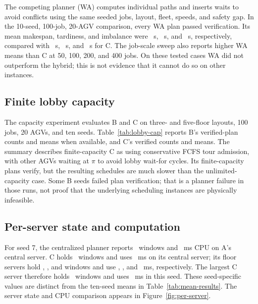 The competing planner (WA) computes individual paths and inserts waits to
avoid conflicts using the same seeded jobs, layout, fleet, speeds, and safety
gap. In the 10-seed, 100-job, 20-AGV comparison, every WA plan passed
verification. Its mean makespan, tardiness, and imbalance were \WAMakespan~s,
\WATardiness~s, and \WAImbalance~s, respectively, compared with \MakespanC~s,
\TardinessC~s, and \ImbalanceC~s for C. The job-scale sweep also reports higher WA
means than C at 50, 100, 200, and 400 jobs. On these tested cases WA did not
outperform the hybrid; this is not evidence that it cannot do so on other
instances.

\subsection{Finite lobby capacity}

The capacity experiment evaluates B and C on three- and five-floor layouts,
100 jobs, 20 AGVs, and ten seeds. Table~\ref{tab:lobby-cap} reports B's
verified-plan counts and means when available, and C's verified counts and
means. The summary describes finite-capacity C as using conservative FCFS
tour admission, with other AGVs waiting at $\pi$ to avoid lobby wait-for
cycles. Its finite-capacity plans verify, but the resulting schedules are
much slower than the unlimited-capacity case. Some B seeds failed plan
verification; that is a planner failure in those runs, not proof that the
underlying scheduling instances are physically infeasible.

\begin{table}[htbp]
\centering
\scriptsize
\caption{Finite-lobby results: verified runs out of ten and mean $\pm$ sd makespan / tardiness (s).}
\label{tab:lobby-cap}

\end{table}

\subsection{Per-server state and computation}

For seed 7, the centralized planner reports \SeedSevenWindowsCentralA~windows and
\SeedSevenCpuCentralA~ms CPU on A's central server. C holds
\SeedSevenWindowsCentralC~windows and uses \SeedSevenCpuCentralC~ms on
its central server; its floor servers hold \SeedSevenWindowsFloorOneC,
\SeedSevenWindowsFloorTwoC, and \SeedSevenWindowsFloorThreeC windows and use
\SeedSevenCpuFloorOneC, \SeedSevenCpuFloorTwoC, and \SeedSevenCpuFloorThreeC~ms,
respectively. The largest C server therefore holds
\SeedSevenLargestCWindows~windows and uses \SeedSevenLargestCCpu~ms in this
seed. These seed-specific values are
distinct from the ten-seed means in Table~\ref{tab:mean-results}. The server
state and CPU comparison appears in Figure~\ref{fig:per-server}.

